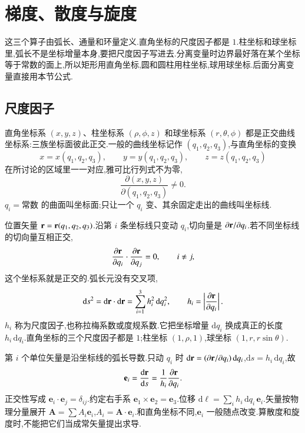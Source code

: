 \section{梯度、散度与旋度}
\label{sec:coordinates}

这三个算子由弧长、通量和环量定义.直角坐标的尺度因子都是 $1$.柱坐标和球坐标里,弧长不是坐标增量本身,要把尺度因子写进去.分离变量时边界最好落在某个坐标等于常数的面上,所以矩形用直角坐标,圆和圆柱用柱坐标,球用球坐标.后面分离变量直接用本节公式.

\subsection{尺度因子}

直角坐标系 $(x,y,z)$、柱坐标系 $(\rho,\phi,z)$ 和球坐标系 $(r,\theta,\phi)$ 都是正交曲线坐标系:三族坐标面彼此正交.一般的曲线坐标记作 $(q_1,q_2,q_3)$,与直角坐标的变换
\begin{equation}
  x=x(q_1,q_2,q_3),\qquad
  y=y(q_1,q_2,q_3),\qquad
  z=z(q_1,q_2,q_3)
\end{equation}
在所讨论的区域里一一对应,雅可比行列式不为零,
\begin{equation}
  \frac{\partial(x,y,z)}{\partial(q_1,q_2,q_3)}\neq 0.
\end{equation}
$q_i=\textrm{常数}$ 的曲面叫坐标面;只让一个 $q_i$ 变、其余固定走出的曲线叫坐标线.

位置矢量 ${\mathbf{r}}={\mathbf{r}}(q_1,q_2,q_3)$.沿第 $i$ 条坐标线只变动 $q_i$,切向量是 $\partial{\mathbf{r}}/\partial q_i$.若不同坐标线的切向量互相正交,
\begin{equation}
  \frac{\partial{\mathbf{r}}}{\partial q_i}\cdot\frac{\partial{\mathbf{r}}}{\partial q_j}=0,
  \qquad i\neq j,
\end{equation}
这个坐标系就是正交的.弧长元没有交叉项,
\begin{equation}
  \mathrm{d}s^2
  =\mathrm{d}{\mathbf{r}}\cdot\mathrm{d}{\mathbf{r}}
  =\sum_{i=1}^{3} h_i^2\,\mathrm{d}q_i^2,
  \qquad
  h_i=\left|\frac{\partial{\mathbf{r}}}{\partial q_i}\right|.
  \label{eq:scale-factor}
\end{equation}
$h_i$ 称为尺度因子,也称拉梅系数或度规系数.它把坐标增量 $\mathrm{d}q_i$ 换成真正的长度 $h_i\,\mathrm{d}q_i$.直角坐标的三个尺度因子都是 $1$;柱坐标 $(1,\rho,1)$,球坐标 $(1,r,r\sin\theta)$.

第 $i$ 个单位矢量是沿坐标线的弧长导数.只动 $q_i$ 时 $\mathrm{d}{\mathbf{r}}=(\partial{\mathbf{r}}/\partial q_i)\,\mathrm{d}q_i$,$\mathrm{d}s=h_i\,\mathrm{d}q_i$,故
\begin{equation}
  \mathbf{e}_i=\frac{\mathrm{d}{\mathbf{r}}}{\mathrm{d}s}=\frac{1}{h_i}\frac{\partial{\mathbf{r}}}{\partial q_i}.
  \label{eq:unit-vector}
\end{equation}
正交性写成 $\mathbf{e}_i\cdot\mathbf{e}_j=\delta_{ij}$.约定右手系 $\mathbf{e}_1\times\mathbf{e}_2=\mathbf{e}_3$.位移 $\mathrm{d}\boldsymbol{\ell}=\sum_i h_i\,\mathrm{d}q_i\,\mathbf{e}_i$.矢量按物理分量展开 $\mathbf{A}=\sum A_i\mathbf{e}_i$,$A_i=\mathbf{A}\cdot\mathbf{e}_i$.和直角坐标不同,$\mathbf{e}_i$ 一般随点改变.算散度和旋度时,不能把它们当成常矢量提出求导.

